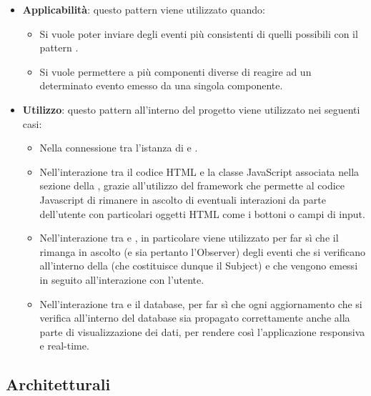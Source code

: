 \begin{itemize}
	\item \textbf{Applicabilità}: questo pattern viene utilizzato quando:
		  \begin{itemize}
		  	 	\item Si vuole poter inviare degli eventi più consistenti di quelli possibili con il pattern .
		  	 	\item Si vuole permettere a più componenti diverse di reagire ad un determinato evento emesso da una singola componente.
		  \end{itemize}
	\item \textbf{Utilizzo}: questo pattern all'interno del progetto viene utilizzato nei seguenti casi:
		  \begin{itemize}
		  		\item Nella connessione tra l'istanza di  e \progettoShort.
		  		\item Nell'interazione tra il codice HTML e la classe JavaScript associata nella sezione della , grazie all'utilizzo del framework  che permette al codice Javascript di rimanere in ascolto di eventuali interazioni da parte dell'utente con particolari oggetti HTML come i bottoni o campi di input.
		  	 	\item Nell'interazione tra  e , in particolare viene utilizzato per far sì che il  rimanga in ascolto (e sia pertanto l'Observer) degli eventi che si verificano all'interno della  (che costituisce dunque il Subject) e che vengono emessi in seguito all'interazione con l'utente.
		  	 	\item Nell'interazione tra  e il database, per far sì che ogni aggiornamento che si verifica all'interno del database sia propagato correttamente anche alla parte di visualizzazione dei dati, per rendere così l'applicazione responsiva e real-time.
		  \end{itemize}
\end{itemize}

\subsection{Architetturali}
